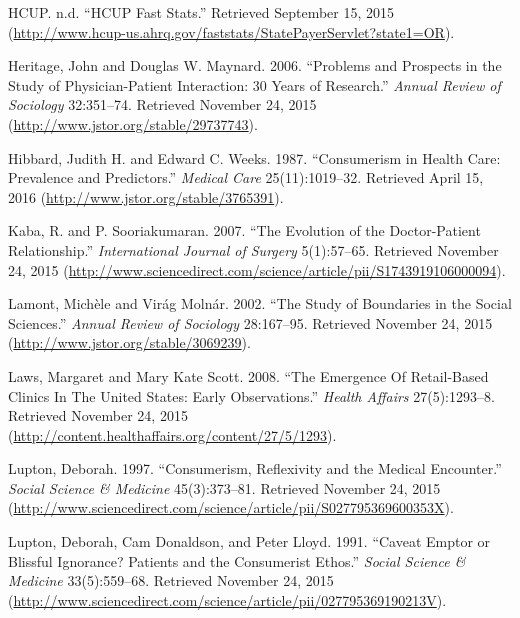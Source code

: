\documentclass[12pt,twoside]{reedthesis}
\begin{document}
  \hypertarget{ref-HCUP}{}
  HCUP. n.d. ``HCUP Fast Stats.'' Retrieved September 15, 2015
  (\url{http://www.hcup-us.ahrq.gov/faststats/StatePayerServlet?state1=OR}).
  
  \hypertarget{ref-heritageux5fproblemsux5f2006}{}
  Heritage, John and Douglas W. Maynard. 2006. ``Problems and Prospects in
  the Study of Physician-Patient Interaction: 30 Years of Research.''
  \emph{Annual Review of Sociology} 32:351--74. Retrieved November 24,
  2015 (\url{http://www.jstor.org/stable/29737743}).
  
  \hypertarget{ref-hibbardux5fconsumerismux5f1987}{}
  Hibbard, Judith H. and Edward C. Weeks. 1987. ``Consumerism in Health
  Care: Prevalence and Predictors.'' \emph{Medical Care} 25(11):1019--32.
  Retrieved April 15, 2016 (\url{http://www.jstor.org/stable/3765391}).
  
  \hypertarget{ref-kabaux5fevolutionux5f2007}{}
  Kaba, R. and P. Sooriakumaran. 2007. ``The Evolution of the
  Doctor-Patient Relationship.'' \emph{International Journal of Surgery}
  5(1):57--65. Retrieved November 24, 2015
  (\url{http://www.sciencedirect.com/science/article/pii/S1743919106000094}).
  
  \hypertarget{ref-lamontux5fstudyux5f2002}{}
  Lamont, Michèle and Virág Molnár. 2002. ``The Study of Boundaries in the
  Social Sciences.'' \emph{Annual Review of Sociology} 28:167--95.
  Retrieved November 24, 2015 (\url{http://www.jstor.org/stable/3069239}).
  
  \hypertarget{ref-lawsux5femergenceux5f2008}{}
  Laws, Margaret and Mary Kate Scott. 2008. ``The Emergence Of
  Retail-Based Clinics In The United States: Early Observations.''
  \emph{Health Affairs} 27(5):1293--8. Retrieved November 24, 2015
  (\url{http://content.healthaffairs.org/content/27/5/1293}).
  
  \hypertarget{ref-luptonux5fconsumerismux5f1997}{}
  Lupton, Deborah. 1997. ``Consumerism, Reflexivity and the Medical
  Encounter.'' \emph{Social Science \& Medicine} 45(3):373--81. Retrieved
  November 24, 2015
  (\url{http://www.sciencedirect.com/science/article/pii/S027795369600353X}).
  
  \hypertarget{ref-luptonux5fcaveatux5f1991}{}
  Lupton, Deborah, Cam Donaldson, and Peter Lloyd. 1991. ``Caveat Emptor
  or Blissful Ignorance? Patients and the Consumerist Ethos.''
  \emph{Social Science \& Medicine} 33(5):559--68. Retrieved November 24,
  2015
  (\url{http://www.sciencedirect.com/science/article/pii/027795369190213V}).
  
\end{document}
